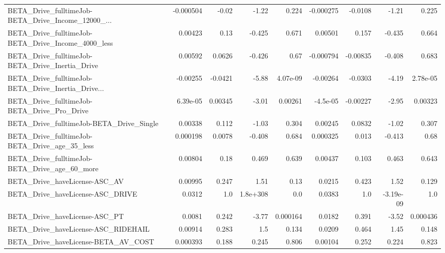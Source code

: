 \begin{tabular}{lrrrrrrrr}
BETA\_Drive\_fulltimeJob-BETA\_Drive\_Income\_12000\_... &   -0.000504 &        -0.02 &    -1.22 &    0.224 &  -0.000275 &     -0.0108 &        -1.21 &         0.225 \\
BETA\_Drive\_fulltimeJob-BETA\_Drive\_Income\_4000\_less &     0.00423 &         0.13 &   -0.425 &    0.671 &    0.00501 &       0.157 &       -0.435 &         0.664 \\
BETA\_Drive\_fulltimeJob-BETA\_Drive\_Inertia\_Drive    &     0.00592 &       0.0626 &   -0.426 &     0.67 &  -0.000794 &    -0.00835 &       -0.408 &         0.683 \\
BETA\_Drive\_fulltimeJob-BETA\_Drive\_Inertia\_Drive... &    -0.00255 &      -0.0421 &    -5.88 & 4.07e-09 &   -0.00264 &     -0.0303 &        -4.19 &      2.78e-05 \\
BETA\_Drive\_fulltimeJob-BETA\_Drive\_Pro\_Drive        &    6.39e-05 &      0.00345 &    -3.01 &  0.00261 &   -4.5e-05 &    -0.00227 &        -2.95 &       0.00323 \\
BETA\_Drive\_fulltimeJob-BETA\_Drive\_Single           &     0.00338 &        0.112 &    -1.03 &    0.304 &    0.00245 &      0.0832 &        -1.02 &         0.307 \\
BETA\_Drive\_fulltimeJob-BETA\_Drive\_age\_35\_less      &    0.000198 &       0.0078 &   -0.408 &    0.684 &   0.000325 &       0.013 &       -0.413 &          0.68 \\
BETA\_Drive\_fulltimeJob-BETA\_Drive\_age\_60\_more      &     0.00804 &         0.18 &    0.469 &    0.639 &    0.00437 &       0.103 &        0.463 &         0.643 \\
BETA\_Drive\_haveLicense-ASC\_AV                      &     0.00995 &        0.247 &     1.51 &     0.13 &     0.0215 &       0.423 &         1.52 &         0.129 \\
BETA\_Drive\_haveLicense-ASC\_DRIVE                   &      0.0312 &          1.0 & 1.8e+308 &      0.0 &     0.0383 &         1.0 &    -3.19e-09 &           1.0 \\
BETA\_Drive\_haveLicense-ASC\_PT                      &      0.0081 &        0.242 &    -3.77 & 0.000164 &     0.0182 &       0.391 &        -3.52 &      0.000436 \\
BETA\_Drive\_haveLicense-ASC\_RIDEHAIL                &     0.00914 &        0.283 &      1.5 &    0.134 &     0.0209 &       0.464 &         1.45 &         0.148 \\
BETA\_Drive\_haveLicense-BETA\_AV\_COST                &    0.000393 &        0.188 &    0.245 &    0.806 &    0.00104 &       0.252 &        0.224 &         0.823 \\

\end{tabular}

